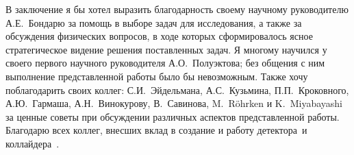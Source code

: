 В заключение я бы хотел выразить благодарность своему научному руководителю А.Е.~Бондарю за помощь в выборе задач для исследования, а также за обсуждения физических вопросов, в ходе которых сформировалось ясное стратегическое видение решения поставленных задач.  Я многому научился у своего первого научного руководителя А.О.~Полуэктова; без общения с ним выполнение представленной работы было бы невозможным.  Также хочу поблагодарить своих коллег: С.И.~Эйдельмана, А.С.~Кузьмина, П.П.~Кроковного, А.Ю.~Гармаша, А.Н.~Винокурову, В.~Савинова, M.~R\"{o}hrken и K.~Miyabayashi за ценные советы при обсуждении различных аспектов представленной работы.  Благодарю всех коллег, внесших вклад в создание и работу детектора~\belle и коллайдера~\kekb.
